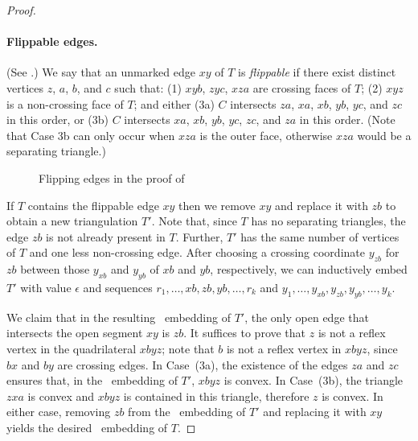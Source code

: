\begin{proof}
	
	\paragraph{Flippable edges.}
	(See .)
	We say that an unmarked edge $xy$ of $T$ is \emph{flippable} if there
	exist distinct vertices $z$, $a$, $b$, and $c$ such that: (1) $xyb$, $zyc$, $xza$ are crossing faces of $T$; (2) $xyz$ is a non-crossing face of $T$; and either (3a) $C$ intersects $za$, $xa$, $xb$, $yb$, $yc$, and $zc$ in this order, or (3b) $C$ intersects $xa$, $xb$, $yb$, $yc$, $zc$, and $za$ in this order. (Note that Case 3b can only occur when $xza$ is the outer face, otherwise $xza$ would be a separating triangle.)  
	\begin{figure}
		\caption{Flipping edges in the proof of
			}
	\end{figure}
	
	If $T$ contains the flippable edge $xy$ then we remove $xy$ and replace it with $zb$ to obtain a new triangulation $T'$. Note that, since $T$ has no separating triangles, the edge $zb$ is not already present in $T$. Further, $T'$ has the same number of vertices of $T$ and one less non-crossing edge. After choosing a crossing coordinate $y_{zb}$ for $zb$ between those $y_{xb}$ and $y_{yb}$ of $xb$ and $yb$, respectively, we can inductively embed $T'$ with value $\epsilon$ and sequences $r_1,\dots,xb,zb,yb,\dots,r_k$ and $y_1,\dots,y_{xb},y_{zb},y_{yb},\dots,y_k$.
	
	We claim that in the resulting \Fary\ embedding of $T'$, the only open edge
	that intersects the open segment $xy$ is $zb$. It suffices to prove that $z$ is not a reflex vertex in the quadrilateral $xbyz$; note that $b$ is not a reflex vertex in $xbyz$, since $bx$ and $by$ are crossing edges. In Case~(3a), the existence of the
	edges $za$ and $zc$ ensures that, in the \Fary\ embedding of $T'$,
	$xbyz$ is convex. In Case~(3b), the triangle $zxa$ is convex and $xbyz$ is contained in this triangle, therefore $z$ is convex. In either case, removing $zb$ from the \Fary\ embedding of $T'$ and replacing it with $xy$ yields the desired \Fary\ embedding of $T$.
	

\end{proof}
